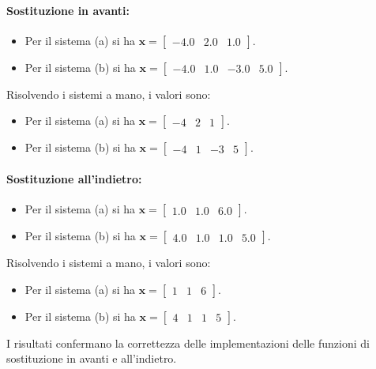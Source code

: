 \documentclass[letterpaper, 12pt]{article}
\begin{document}
\paragraph{Sostituzione in avanti:}
\begin{itemize}
    \item Per il sistema (a) si ha $\mathbf{x} = \begin{bmatrix} -4.0 & 2.0 & 1.0 \end{bmatrix}$.
    \item Per il sistema (b) si ha $\mathbf{x} = \begin{bmatrix} -4.0 & 1.0 & -3.0 & 5.0 \end{bmatrix}$.
\end{itemize}
Risolvendo i sistemi a mano, i valori sono:
\begin{itemize}
    \item Per il sistema (a) si ha $\mathbf{x} = \begin{bmatrix} -4 & 2 & 1 \end{bmatrix}$.
    \item Per il sistema (b) si ha $\mathbf{x} = \begin{bmatrix} -4 & 1 & -3 & 5 \end{bmatrix}$.
\end{itemize}
\paragraph{Sostituzione all'indietro:}
\begin{itemize}
    \item Per il sistema (a) si ha $\mathbf{x} = \begin{bmatrix} 1.0 & 1.0 & 6.0 \end{bmatrix}$.
    \item Per il sistema (b) si ha $\mathbf{x} = \begin{bmatrix} 4.0 & 1.0 & 1.0 & 5.0 \end{bmatrix}$.
\end{itemize}
Risolvendo i sistemi a mano, i valori sono:
\begin{itemize}
    \item Per il sistema (a) si ha $\mathbf{x} = \begin{bmatrix} 1 & 1 & 6 \end{bmatrix}$.
    \item Per il sistema (b) si ha $\mathbf{x} = \begin{bmatrix} 4 & 1 & 1 & 5 \end{bmatrix}$.
\end{itemize}
I risultati confermano la correttezza delle implementazioni delle funzioni di sostituzione in avanti e all'indietro.
\end{document}
